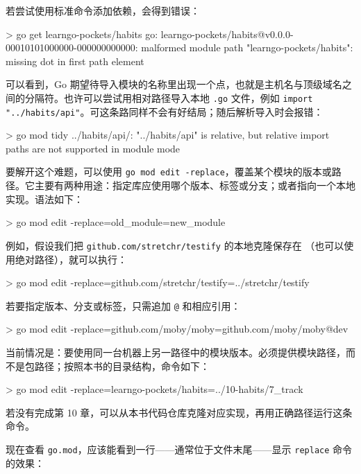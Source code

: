 若尝试使用标准命令添加依赖，会得到错误：

\begin{shellcode}[]
> go get learngo-pockets/habits
go: learngo-pockets/habits@v0.0.0-00010101000000-000000000000:
malformed module path "learngo-pockets/habits": missing dot in
first path element
\end{shellcode}

可以看到，Go 期望待导入模块的名称里出现一个点，也就是主机名与顶级域名之间的分隔符。也许可以尝试用相对路径导入本地 \texttt{.go} 文件，例如 \texttt{import "../habits/api"}。可这条路同样不会有好结局；随后解析导入时会报错：

\begin{shellcode}[]
> go mod tidy
../habits/api/: "../habits/api" is relative, but relative import
paths are not supported in module mode
\end{shellcode}

要解开这个难题，可以使用 \texttt{go mod edit -replace}，覆盖某个模块的版本或路径。它主要有两种用途：指定库应使用哪个版本、标签或分支；或者指向一个本地实现。语法如下：

\begin{shellcode}[]
> go mod edit -replace=old_module=new_module
\end{shellcode}

例如，假设我们把 \texttt{github.com/stretchr/testify} 的本地克隆保存在 （也可以使用绝对路径），就可以执行：

\begin{shellcode}[]
> go mod edit -replace=github.com/stretchr/testify=../stretchr/testify
\end{shellcode}

若要指定版本、分支或标签，只需追加 \texttt{@} 和相应引用：

\begin{shellcode}[]
> go mod edit -replace=github.com/moby/moby=github.com/moby/moby@dev
\end{shellcode}

当前情况是：要使用同一台机器上另一路径中的模块版本。必须提供模块路径，而不是包路径；按照本书的目录结构，命令如下：

\begin{shellcode}[]
> go mod edit -replace=learngo-pockets/habits=../10-habits/7_track
\end{shellcode}

若没有完成第 10 章，可以从本书代码仓库克隆对应实现，再用正确路径运行这条命令。

现在查看 \texttt{go.mod}，应该能看到一行——通常位于文件末尾——显示 \texttt{replace} 命令的效果：


